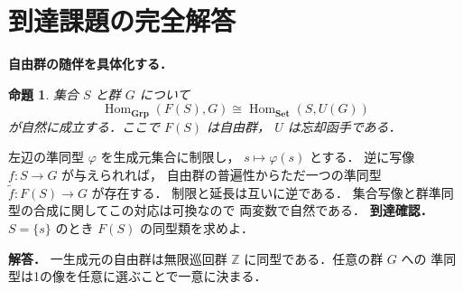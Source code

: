 \documentclass[a5paper,10pt,onecolumn]{jsarticle}
\makeatletter
\theoremstyle{mathnotetheorem}
\newtheorem{proposition}[theorem]{命題}
\renewcommand{\proofname}{証明}
\renewenvironment{proof}[1][\proofname]{%
  \par\pushQED{\qed}\normalfont\topsep4\p@\@plus2\p@\relax
  \trivlist\item[\hskip\labelsep\bfseries #1]\ignorespaces
}{\popQED\endtrivlist\@endpefalse}
\makeatother
\begin{document}
\section{到達課題の完全解答}
\noindent\textbf{自由群の随伴を具体化する．}
\begin{proposition}
集合 $S$ と群 $G$ について
\[
\operatorname{Hom}_{\mathbf{Grp}}(F(S),G)
\cong
\operatorname{Hom}_{\mathbf{Set}}(S,U(G))
\]
が自然に成立する．ここで $F(S)$ は自由群，
$U$ は忘却函手である．
\end{proposition}
\begin{proof}
左辺の準同型 $\varphi$ を生成元集合に制限し，
$s\mapsto\varphi(s)$ とする．
逆に写像 $f:S\to G$ が与えられれば，
自由群の普遍性からただ一つの準同型
$\widetilde f:F(S)\to G$ が存在する．
制限と延長は互いに逆である．
集合写像と群準同型の合成に関してこの対応は可換なので
両変数で自然である．
\end{proof}
\noindent\textbf{到達確認．}
$S=\{s\}$ のとき $F(S)$ の同型類を求めよ．
\par\noindent\textbf{解答．}
一生成元の自由群は無限巡回群
$\mathbb Z$ に同型である．任意の群 $G$ への
準同型は1の像を任意に選ぶことで一意に決まる．
\end{document}
